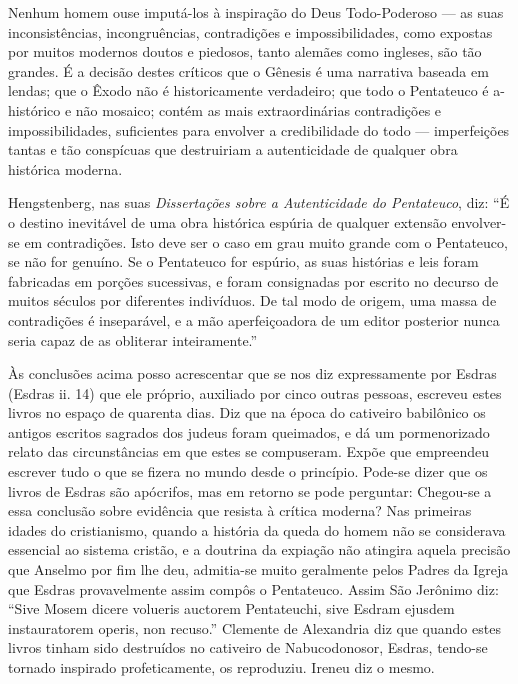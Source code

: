 \documentclass[11pt,a5paper,twoside,openany]{book}
\begin{document}
Nenhum homem ouse imputá-los à inspiração do Deus Todo-Poderoso — as suas inconsistências, incongruências, contradições e impossibilidades, como expostas por muitos modernos doutos e piedosos, tanto alemães como ingleses, são tão grandes. É a decisão destes críticos que o Gênesis é uma narrativa baseada em lendas; que o Êxodo não é historicamente verdadeiro; que todo o Pentateuco é a-histórico e não mosaico; contém as mais extraordinárias contradições e impossibilidades, suficientes para envolver a credibilidade do todo — imperfeições tantas e tão conspícuas que destruiriam a autenticidade de qualquer obra histórica moderna.

Hengstenberg, nas suas \textit{Dissertações sobre a Autenticidade do Pentateuco}, diz: “É o destino inevitável de uma obra histórica espúria de qualquer extensão envolver-se em contradições. Isto deve ser o caso em grau muito grande com o Pentateuco, se não for genuíno. Se o Pentateuco for espúrio, as suas histórias e leis foram fabricadas em porções sucessivas, e foram consignadas por escrito no decurso de muitos séculos por diferentes indivíduos. De tal modo de origem, uma massa de contradições é inseparável, e a mão aperfeiçoadora de um editor posterior nunca seria capaz de as obliterar inteiramente.”

Às conclusões acima posso acrescentar que se nos diz expressamente por Esdras (Esdras ii. 14) que ele próprio, auxiliado por cinco outras pessoas, escreveu estes livros no espaço de quarenta dias. Diz que na época do cativeiro babilônico os antigos escritos sagrados dos judeus foram queimados, e dá um pormenorizado relato das circunstâncias em que estes se compuseram. Expõe que empreendeu escrever tudo o que se fizera no mundo desde o princípio. Pode-se dizer que os livros de Esdras são apócrifos, mas em retorno se pode perguntar: Chegou-se a essa conclusão sobre evidência que resista à crítica moderna? Nas primeiras idades do cristianismo, quando a história da queda do homem não se considerava essencial ao sistema cristão, e a doutrina da expiação não atingira aquela precisão que Anselmo por fim lhe deu, admitia-se muito geralmente pelos Padres da Igreja que Esdras provavelmente assim compôs o Pentateuco. Assim São Jerônimo diz: “Sive Mosem dicere volueris auctorem Pentateuchi, sive Esdram ejusdem instauratorem operis, non recuso.” Clemente de Alexandria diz que quando estes livros tinham sido destruídos no cativeiro de Nabucodonosor, Esdras, tendo-se tornado inspirado profeticamente, os reproduziu. Ireneu diz o mesmo.
\end{document}
